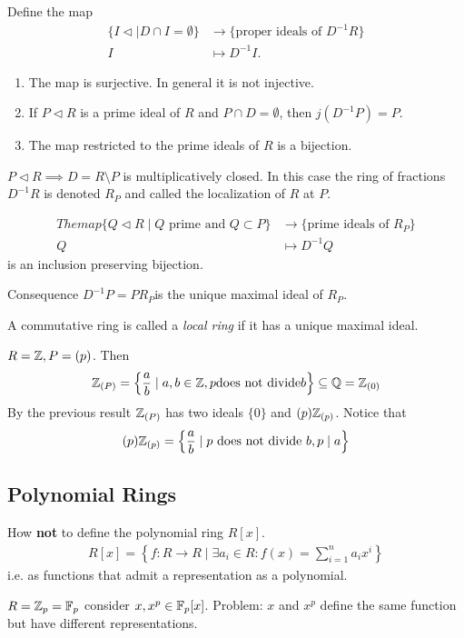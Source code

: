 \documentclass[master.tex]{subfiles}
\begin{document}
  \begin{prop}
    Define the map
    \begin{align*}
      \{I \lhd \mid D \cap I = \emptyset\} &\longrightarrow \{\text{proper ideals of } D^{-1}R\}\\
      I &\longmapsto D^{-1} I.
    \end{align*}
    \begin{enumerate}[label=(\alph*)]
    \item The map is surjective. In general it is not injective.
    \item If \(P \lhd R\) is a prime ideal of \(R\) and \(P \cap D = \emptyset\), then \(j(D^{-1}P)=P\).
    \item The map restricted to the prime ideals of \(R\) is a bijection.
    \end{enumerate}
  \end{prop}

  \begin{defn}
    \(P \lhd R \implies D = R \setminus P\) is multiplicatively closed. In this case the ring of fractions \(D^{-1}R\)
    is denoted \(R_P\) and called the localization of \(R\) at \(P\).
  \end{defn}

  \begin{cor}
    \begin{align*}
      The map
      \{Q \lhd R \mid Q \text{ prime and } Q \subset P\} &\longrightarrow \{\text{prime ideals of } R_P \}\\
      Q& \longmapsto D^{-1}Q
    \end{align*}
    is an inclusion preserving bijection.
  \end{cor}
  Consequence \(D^{-1}P=PR_P\)is the unique maximal ideal of \(R_P\).

  \begin{defn*}
    A commutative ring is called a \emph{local ring} if it has a unique maximal ideal.
  \end{defn*}
  \begin{example}
    \(R={\mathbb Z}, P=(p)\). Then
    \[{\mathbb Z}_{(P)}=\left\{\frac{a}{b} \mid a,b \in {\mathbb Z}, p \text{does not divide} b\right\} \subseteq {\mathbb Q} = {\mathbb Z}_{(0)}\]
    By the previous result \({\mathbb Z}_{(P)}\) has two ideals \(\{0\}\) and \((p){\mathbb Z}_{(p)}\). Notice that
    \[(p){\mathbb Z}_{(p)}=\left\{\frac{a}{b} \mid p \text{ does not divide } b, p \mid a\right\}\]
  \end{example}
  \subsection{Polynomial Rings}
  How \textbf{not} to define the polynomial ring \(R[x]\).
  \begin{align*}
    R[x] = \left\{f \colon R \to R \mid \exists a_{i} \in R : f(x)=\sum_{i=1}^na_ix^i\right\}
  \end{align*}
  i.e. as functions that admit a representation as a polynomial.
  \begin{example}
   \(R = {\mathbb Z}_p = \mathbb{F}_p\) consider \(x, x^p \in \mathbb{F}_p[x]\). Problem: \(x\) and \(x^p\) define the same function but have
   different representations. 
  \end{example}
\end{document}
